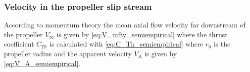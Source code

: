 \subsubsection{Velocity in the propeller slip stream}
\label{sec:propeller_induced_velocity}
According to momentum theory the mean axial flow velocity far downstream of the propeller $V_{\infty}$ is given by \autoref{eq:V_infty_semiempirical} \cite{brix_manoeuvring_1993} where the thrust coefficient $C_{Th}$ is calculated with \autoref{eq:C_Th_semiempirical} where $r_0$ is the propeller radius and the apparent velocity $V_A$ is given by \autoref{eq:V_A_semiempirical}.
\begin{equation}
    \label{eq:V_infty_semiempirical}
    
\end{equation}
%
\begin{equation}
    \label{eq:C_Th_semiempirical}
    
\end{equation}
%
\begin{equation}
    \label{eq:V_A_semiempirical}
    
\end{equation}

